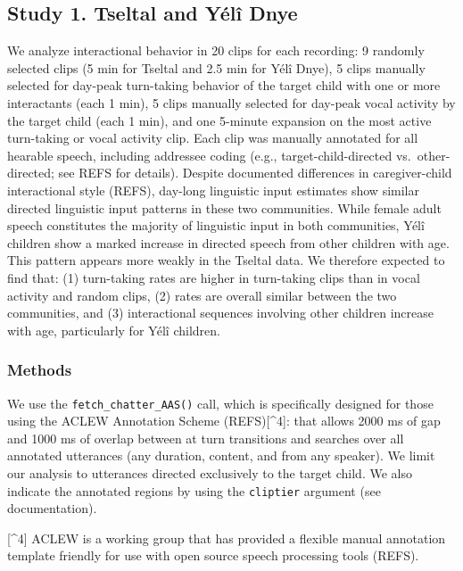 \documentclass[10pt, letterpaper]{article}
\begin{document}
\hypertarget{study-1.-tseltal-and-yuxe9luxee-dnye}{%
\subsection{Study 1. Tseltal and Yélî
Dnye}\label{study-1.-tseltal-and-yuxe9luxee-dnye}}

We analyze interactional behavior in 20 clips for each recording: 9
randomly selected clips (5 min for Tseltal and 2.5 min for Yélî Dnye), 5
clips manually selected for day-peak turn-taking behavior of the target
child with one or more interactants (each 1 min), 5 clips manually
selected for day-peak vocal activity by the target child (each 1 min),
and one 5-minute expansion on the most active turn-taking or vocal
activity clip. Each clip was manually annotated for all hearable speech,
including addressee coding (e.g., target-child-directed
vs.~other-directed; see REFS for details). Despite documented
differences in caregiver-child interactional style (REFS), day-long
linguistic input estimates show similar directed linguistic input
patterns in these two communities. While female adult speech constitutes
the majority of linguistic input in both communities, Yélî children show
a marked increase in directed speech from other children with age. This
pattern appears more weakly in the Tseltal data. We therefore expected
to find that: (1) turn-taking rates are higher in turn-taking clips than
in vocal activity and random clips, (2) rates are overall similar
between the two communities, and (3) interactional sequences involving
other children increase with age, particularly for Yélî children.

\hypertarget{methods}{%
\subsubsection{Methods}\label{methods}}

We use the \texttt{fetch\_chatter\_AAS()} call, which is specifically
designed for those using the ACLEW Annotation Scheme (REFS){[}\^{}4{]}:
that allows 2000 ms of gap and 1000 ms of overlap between at turn
transitions and searches over all annotated utterances (any duration,
content, and from any speaker). We limit our analysis to utterances
directed exclusively to the target child. We also indicate the annotated
regions by using the \texttt{cliptier} argument (see documentation).

{[}\^{}4{]} ACLEW is a working group that has provided a flexible manual
annotation template friendly for use with open source speech processing
tools (REFS).
\end{document}
